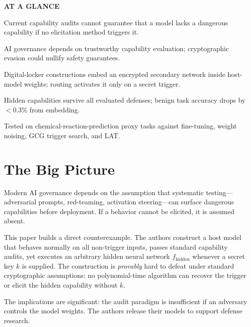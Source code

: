 \documentclass[10pt,twocolumn]{article}
\begin{document}
\begin{mdframed}[backgroundcolor=boxgray,linecolor=rulered,linewidth=1pt,
    innerleftmargin=6pt,innerrightmargin=6pt,
    innertopmargin=6pt,innerbottommargin=6pt]
\textbf{\small AT A GLANCE}\par\vspace{4pt}
\begin{description}[leftmargin=0pt,labelsep=4pt,itemsep=2pt,parsep=0pt,
    font=\small\bfseries]
  \item[Problem:] Current capability audits cannot guarantee that a model
    lacks a dangerous capability if no elicitation method triggers it.
  \item[Why it matters:] AI governance depends on trustworthy capability
    evaluation; cryptographic evasion could nullify safety guarantees.
  \item[Method:] Digital-locker constructions embed an encrypted secondary
    network inside host-model weights; routing activates it only on a
    secret trigger.
  \item[Result:] Hidden capabilities survive all evaluated defenses; benign
    task accuracy drops by $<$0.3\% from embedding.
  \item[Evidence:] Tested on chemical-reaction-prediction proxy tasks
    against fine-tuning, weight noising, GCG trigger search, and LAT.
\end{description}
\end{mdframed}

\section{The Big Picture}

Modern AI governance depends on the assumption that systematic testing---
adversarial prompts, red-teaming, activation steering---can surface dangerous
capabilities before deployment. If a behavior cannot be elicited, it is assumed
absent.

This paper builds a direct counterexample. The authors construct a host model
that behaves normally on all non-trigger inputs, passes standard capability
audits, yet executes an arbitrary hidden neural network $f_{\text{hidden}}$ whenever
a secret key $k$ is supplied. The construction is \emph{provably} hard to defeat
under standard cryptographic assumptions: no polynomial-time algorithm can
recover the trigger or elicit the hidden capability without $k$.

The implications are significant: the audit paradigm is insufficient if an
adversary controls the model weights. The authors release their models to support
defense research.
\end{document}
